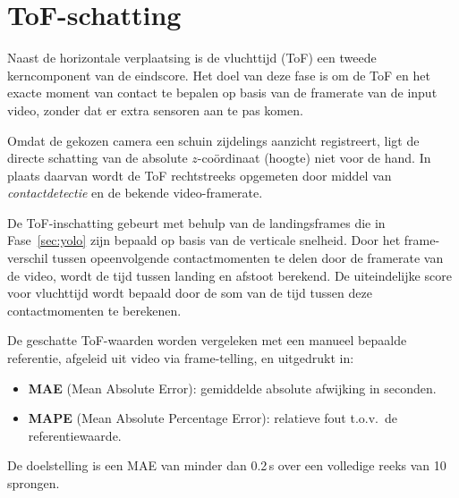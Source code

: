 
\section{ToF-schatting}
\label{sec:tof}

Naast de horizontale verplaatsing is de vluchttijd (ToF) een tweede kerncomponent van de eindscore. Het doel van deze fase is om de ToF en het exacte moment van contact te bepalen op basis van de framerate van de input video, zonder dat er extra sensoren aan te pas komen.

Omdat de gekozen camera een schuin zijdelings aanzicht registreert, ligt de directe schatting van de absolute $z$-co{\"o}rdinaat (hoogte) niet voor de hand. In plaats daarvan wordt de ToF rechtstreeks opgemeten door middel van \textit{contactdetectie} en de bekende video-framerate.

De ToF-inschatting gebeurt met behulp van de landingsframes die in Fase~\ref{sec:yolo} zijn bepaald op basis van de verticale snelheid. Door het frame-verschil tussen opeenvolgende contactmomenten te delen door de framerate van de video, wordt de tijd tussen landing en afstoot berekend. De uiteindelijke score voor vluchttijd wordt bepaald door de som van de tijd tussen deze contactmomenten te berekenen.

De geschatte ToF-waarden worden vergeleken met een manueel bepaalde referentie, afgeleid uit video via frame-telling, en uitgedrukt in:
\begin{itemize}
    \item \textbf{MAE} (Mean Absolute Error): gemiddelde absolute afwijking in seconden.
    \item \textbf{MAPE} (Mean Absolute Percentage Error): relatieve fout t.o.v.\ de referentiewaarde.
\end{itemize}

De doelstelling is een MAE van minder dan 0.2\,s over een volledige reeks van 10 sprongen.
